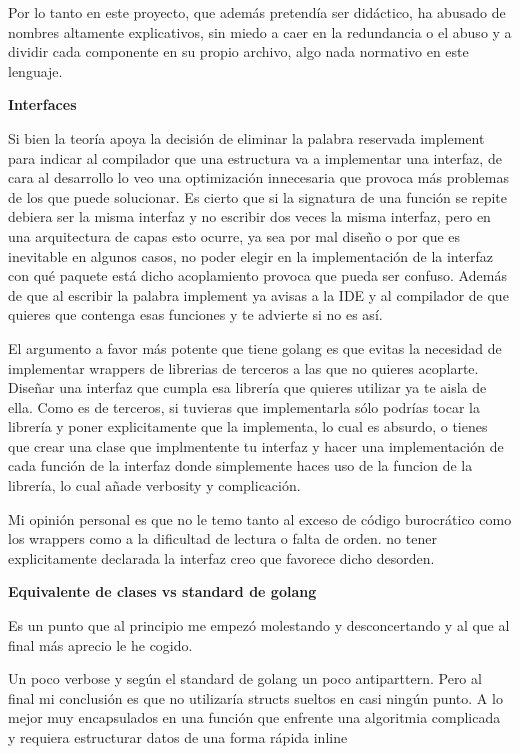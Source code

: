 Por lo tanto en este proyecto, que además pretendía ser didáctico, ha abusado de nombres altamente explicativos, sin miedo a caer en la redundancia o el abuso y a dividir cada componente en su propio archivo, algo nada normativo en este lenguaje.

\textbf{Interfaces}

Si bien la teoría apoya la decisión de eliminar la palabra reservada implement para indicar al compilador que una estructura va a implementar una interfaz, de cara al desarrollo lo veo una optimización innecesaria que provoca más problemas de los que puede solucionar. Es cierto que si la signatura de una función se repite debiera ser la misma interfaz y no escribir dos veces la misma interfaz, pero en una arquitectura de capas esto ocurre, ya sea por mal diseño o por que es inevitable en algunos casos, no poder elegir en la implementación de la interfaz con qué paquete está dicho acoplamiento provoca que pueda ser confuso. Además de que al escribir la palabra implement ya avisas a la IDE y al compilador de que quieres que contenga esas funciones y te advierte si no es así.

El argumento a favor más potente que tiene golang es que evitas la necesidad de implementar wrappers de librerias de terceros a las que no quieres acoplarte. Diseñar una interfaz que cumpla esa librería que quieres utilizar ya te aisla de ella. Como es de terceros, si tuvieras que implementarla sólo podrías tocar la librería y poner explicitamente que la implementa, lo cual es absurdo, o tienes que crear una clase que implmentente tu interfaz y hacer una implementación de cada función de la interfaz donde simplemente haces uso de la funcion de la librería, lo cual añade verbosity y complicación.

Mi opinión personal es que no le temo tanto al exceso de código burocrático como los wrappers como a la dificultad de lectura o falta de orden. no tener explicitamente declarada la interfaz creo que favorece dicho desorden.

\textbf{Equivalente de clases vs standard de golang}

Es un punto que al principio me empezó molestando y desconcertando y al que al final más aprecio le he cogido.

Un poco verbose y según el standard de golang un poco antiparttern. Pero al final mi conclusión es que no utilizaría structs sueltos en casi ningún punto. A lo mejor muy encapsulados en una función que enfrente una algoritmia complicada y requiera estructurar datos de una forma rápida inline

